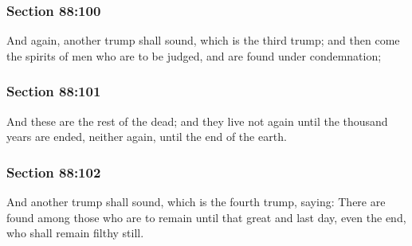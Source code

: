 	\subsubsection{Section 88:100} %
		\label{DC88-100}

		And again, another trump shall sound, which is the third trump; and then come the spirits of men who are to be judged, and are found under condemnation;


	\subsubsection{Section 88:101} %
		\label{DC88-101}

		And these are the rest of the dead; and they live not again until the thousand years are ended, neither again, until the end of the earth.


	\subsubsection{Section 88:102} %
		\label{DC88-102}

		And another trump shall sound, which is the fourth trump, saying: There are found among those who are to remain until that great and last day, even the end, who shall remain filthy still.



